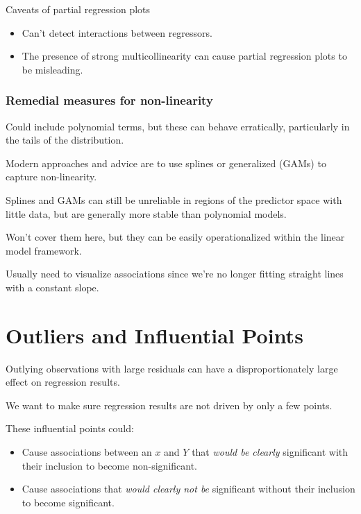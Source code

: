 \documentclass[
  letterpaper,
  DIV=11,
  numbers=noendperiod]{scrreport}
\providecommand{\tightlist}{%
  \setlength{\itemsep}{0pt}\setlength{\parskip}{0pt}}\usepackage{longtable,booktabs,array}
\begin{document}
Caveats of partial regression plots

\begin{itemize}
\tightlist
\item
  Can't detect interactions between regressors.
\item
  The presence of strong multicollinearity can cause partial regression
  plots to be misleading.
\end{itemize}

\hypertarget{remedial-measures-for-non-linearity}{%
\subsubsection{Remedial measures for
non-linearity}\label{remedial-measures-for-non-linearity}}

Could include polynomial terms, but these can behave erratically,
particularly in the tails of the distribution.

Modern approaches and advice are to use splines or generalized (GAMs) to
capture non-linearity.

Splines and GAMs can still be unreliable in regions of the predictor
space with little data, but are generally more stable than polynomial
models.

Won't cover them here, but they can be easily operationalized within the
linear model framework.

Usually need to visualize associations since we're no longer fitting
straight lines with a constant slope.

\hypertarget{outliers-and-influential-points}{%
\section{Outliers and Influential
Points}\label{outliers-and-influential-points}}

Outlying observations with large residuals can have a disproportionately
large effect on regression results.

We want to make sure regression results are not driven by only a few
points.

These influential points could:

\begin{itemize}
\tightlist
\item
  Cause associations between an \(x\) and \(Y\) that \emph{would be
  clearly} significant with their inclusion to become non-significant.
\item
  Cause associations that \emph{would clearly not be} significant
  without their inclusion to become significant.
\end{itemize}
\end{document}
